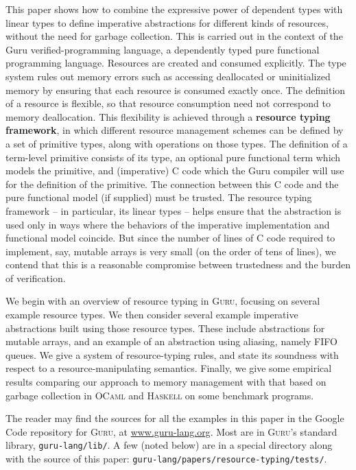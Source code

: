 \documentclass[9pt,natbib]{sigplanconf}
\begin{document}
This paper shows how to combine the expressive power of dependent
types with linear types to define imperative abstractions for
different kinds of resources, without the need for garbage collection.
This is carried out in the context of the Guru verified-programming
language, a dependently typed pure functional programming language.
Resources are created and consumed explicitly.  The type system rules
out memory errors such as accessing deallocated or uninitialized
memory by ensuring that each resource is consumed exactly once.  The
definition of a resource is flexible, so that resource consumption
need not correspond to memory deallocation.  This flexibility is
achieved through a \textbf{resource typing framework}, in which
different resource management schemes can be defined by a set of
primitive types, along with operations on those types.  The definition
of a term-level primitive consists of its type, an optional pure
functional term which models the primitive, and (imperative) C code
which the Guru compiler will use for the definition of the primitive.
The connection between this C code and the pure functional model (if
supplied) must be trusted.  The resource typing framework -- in
particular, its linear types -- helps ensure that the abstraction is
used only in ways where the behaviors of the imperative implementation
and functional model coincide.  But since the number of lines of C
code required to implement, say, mutable arrays is very small (on the
order of tens of lines), we contend that this is a reasonable
compromise between trustedness and the burden of verification.

We begin with an overview of resource typing in \textsc{Guru},
focusing on several example resource types.  We then consider several
example imperative abstractions built using those resource types.
These include abstractions for mutable arrays, and an example of an
abstraction using aliasing, namely FIFO queues.  We give a system of
resource-typing rules, and state its soundness with respect to a
resource-manipulating semantics.  Finally, we give some empirical
results comparing our approach to memory management with that based on
garbage collection in \textsc{OCaml} and \textsc{Haskell} on some
benchmark programs.

The reader may find the sources for all the examples in this paper in
the Google Code repository for \textsc{Guru}, at
\url{www.guru-lang.org}.  Most are in \textsc{Guru}'s standard
library, \texttt{guru-lang/lib/}.  A few (noted below) are in a
special directory along with the source of this paper: \texttt{guru-lang/papers/resource-typing/tests/}.
\end{document}
